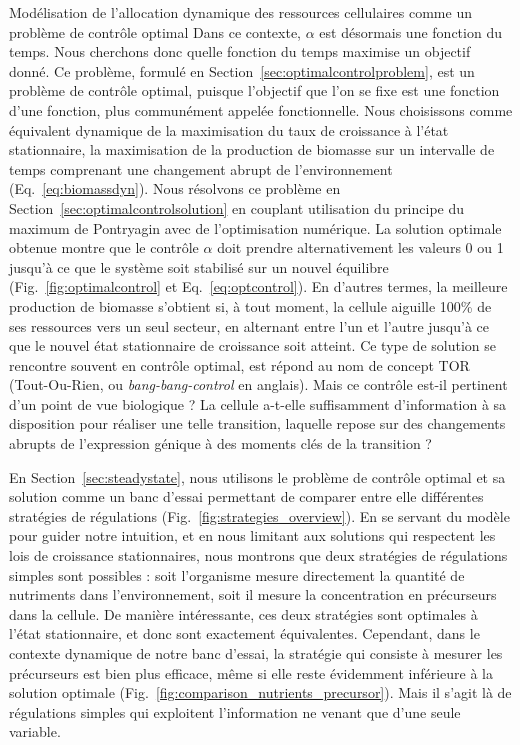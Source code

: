 \begin{chapter_summary}{Modélisation de l'allocation dynamique des ressources cellulaires comme un problème de contrôle optimal}
Dans ce contexte, $\alpha$ est désormais une fonction du temps.
Nous cherchons donc quelle fonction du temps maximise un objectif donné.
Ce problème, formulé en Section~\ref{sec:optimalcontrolproblem}, est un problème de contrôle optimal, puisque l'objectif que l'on se fixe est une fonction d'une fonction, plus communément appelée fonctionnelle.
Nous choisissons comme équivalent dynamique de la maximisation du taux de croissance à l'état stationnaire, la maximisation de la production de biomasse sur un intervalle de temps comprenant une changement abrupt de l'environnement (Eq.~\ref{eq:biomassdyn}).
Nous résolvons ce problème en Section~\ref{sec:optimalcontrolsolution} en couplant utilisation du principe du maximum de Pontryagin avec de l'optimisation numérique.
La solution optimale obtenue montre que le contrôle $\alpha$ doit prendre alternativement les valeurs 0 ou 1 jusqu'à ce que le système soit stabilisé sur un nouvel équilibre (Fig.~\ref{fig:optimalcontrol} et Eq.~\ref{eq:optcontrol}).
En d'autres termes, la meilleure production de biomasse s'obtient si, à tout moment, la cellule aiguille 100\% de ses ressources vers un seul secteur, en alternant entre l'un et l'autre jusqu'à ce que le nouvel état stationnaire de croissance soit atteint.
Ce type de solution se rencontre souvent en contrôle optimal, est répond au nom de concept TOR (Tout-Ou-Rien, ou \textit{bang-bang-control} en anglais).
Mais ce contrôle est-il pertinent d'un point de vue biologique ?
La cellule a-t-elle suffisamment d'information à sa disposition pour réaliser une telle transition, laquelle repose sur des changements abrupts de l'expression génique à des moments clés de la transition ?

En Section~\ref{sec:steadystate}, nous utilisons le problème de contrôle optimal et sa solution comme un banc d'essai permettant de comparer entre elle différentes stratégies de régulations (Fig.~\ref{fig:strategies_overview}).
En se servant du modèle pour guider notre intuition, et en nous limitant aux solutions qui respectent les lois de croissance stationnaires, nous montrons que deux stratégies de régulations simples sont possibles : soit l'organisme mesure directement la quantité de nutriments dans l'environnement, soit il mesure la concentration en précurseurs dans la cellule.
De manière intéressante, ces deux stratégies sont optimales à l'état stationnaire, et donc sont exactement équivalentes.
Cependant, dans le contexte dynamique de notre banc d'essai, la stratégie qui consiste à mesurer les précurseurs est bien plus efficace, même si elle reste évidemment inférieure à la solution optimale (Fig.~\ref{fig:comparison_nutrients_precursor}).
Mais il s'agit là de régulations simples qui exploitent l'information ne venant que d'une seule variable.


\end{chapter_summary}
